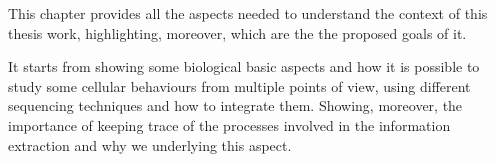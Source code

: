 This chapter provides all the aspects needed to understand the context of this thesis work, highlighting, moreover, which are the the proposed goals of it.

It starts from showing some biological basic aspects and how it is possible to study some cellular behaviours from multiple points of view, using different sequencing techniques and how to integrate them.
Showing, moreover, the importance of keeping trace of the processes involved in the information extraction and why we underlying this aspect. 

